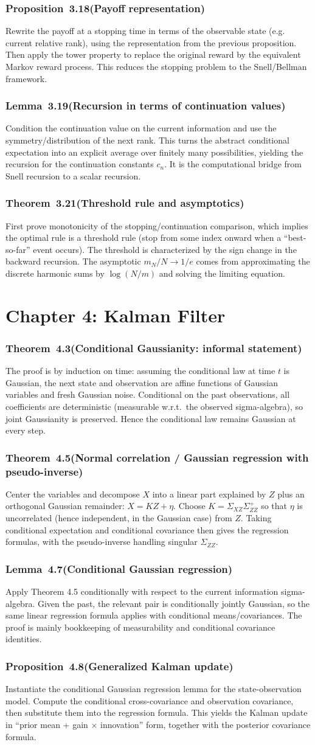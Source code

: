 \documentclass[11pt,a4paper]{article}
\newcommand{\proofcapsule}[4]{%
  \subsubsection*{#1~#2\quad \textnormal{\small(#3)}}%
  #4}
\begin{document}
\proofcapsule{Proposition}{3.18}{Payoff representation}{Rewrite the payoff at a stopping time in terms of the observable state (e.g. current relative rank), using the representation from the previous proposition. Then apply the tower property to replace the original reward by the equivalent Markov reward process. This reduces the stopping problem to the Snell/Bellman framework.}
\proofcapsule{Lemma}{3.19}{Recursion in terms of continuation values}{Condition the continuation value on the current information and use the symmetry/distribution of the next rank. This turns the abstract conditional expectation into an explicit average over finitely many possibilities, yielding the recursion for the continuation constants $c_n$. It is the computational bridge from Snell recursion to a scalar recursion.}
\proofcapsule{Theorem}{3.21}{Threshold rule and asymptotics}{First prove monotonicity of the stopping/continuation comparison, which implies the optimal rule is a threshold rule (stop from some index onward when a ``best-so-far'' event occurs). The threshold is characterized by the sign change in the backward recursion. The asymptotic $m_N/N\to 1/e$ comes from approximating the discrete harmonic sums by $\log(N/m)$ and solving the limiting equation.}
\section{Chapter 4: Kalman Filter}
\proofcapsule{Theorem}{4.3}{Conditional Gaussianity: informal statement}{The proof is by induction on time: assuming the conditional law at time $t$ is Gaussian, the next state and observation are affine functions of Gaussian variables and fresh Gaussian noise. Conditional on the past observations, all coefficients are deterministic (measurable w.r.t.\ the observed sigma-algebra), so joint Gaussianity is preserved. Hence the conditional law remains Gaussian at every step.}
\proofcapsule{Theorem}{4.5}{Normal correlation / Gaussian regression with pseudo-inverse}{Center the variables and decompose $X$ into a linear part explained by $Z$ plus an orthogonal Gaussian remainder: $X=KZ+\eta$. Choose $K=\Sigma_{XZ}\Sigma_{ZZ}^+$ so that $\eta$ is uncorrelated (hence independent, in the Gaussian case) from $Z$. Taking conditional expectation and conditional covariance then gives the regression formulas, with the pseudo-inverse handling singular $\Sigma_{ZZ}$.}
\proofcapsule{Lemma}{4.7}{Conditional Gaussian regression}{Apply Theorem 4.5 conditionally with respect to the current information sigma-algebra. Given the past, the relevant pair is conditionally jointly Gaussian, so the same linear regression formula applies with conditional means/covariances. The proof is mainly bookkeeping of measurability and conditional covariance identities.}
\proofcapsule{Proposition}{4.8}{Generalized Kalman update}{Instantiate the conditional Gaussian regression lemma for the state-observation model. Compute the conditional cross-covariance and observation covariance, then substitute them into the regression formula. This yields the Kalman update in ``prior mean + gain $\times$ innovation'' form, together with the posterior covariance formula.}
\end{document}
